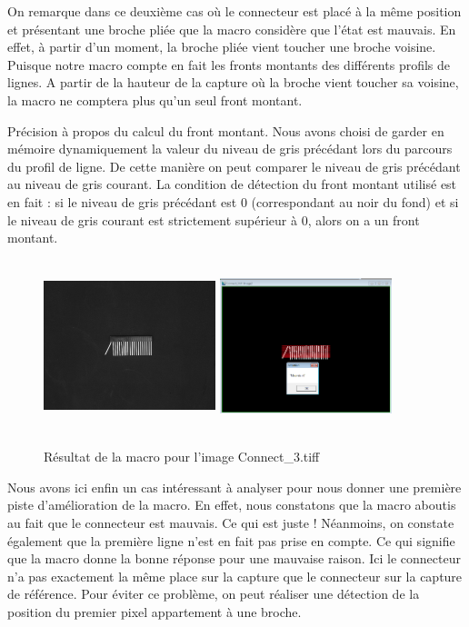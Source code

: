 \documentclass{scrreprt}
\begin{document}
On remarque dans ce deuxième cas où le connecteur est placé à la même position et présentant une broche pliée
que la macro considère que l'état est mauvais. En effet, à partir d'un moment, la broche pliée vient toucher 
une broche voisine. Puisque notre macro compte en fait les fronts montants des différents profils de lignes.
A partir de la hauteur de la capture où la broche vient toucher sa voisine, la macro ne comptera plus qu'un seul
front montant. 

Précision à propos du calcul du front montant. Nous avons choisi de garder en mémoire dynamiquement la valeur du niveau
de gris précédant lors du parcours du profil de ligne. De cette manière on peut comparer le niveau de gris précédant 
au niveau de gris courant. La condition de détection du front montant utilisé est en fait : si le niveau de gris précédant
est 0 (correspondant au noir du fond) et si le niveau de gris courant est strictement supérieur à 0, alors on a un front montant.

\begin{figure}[!h]
\centering
\includegraphics[width=5cm, height=5cm]{images/Connect3o.png}\hfill
\includegraphics[width=5cm, height=5cm]{images/connecteur3.png}
\caption{Résultat de la macro pour l'image Connect_3.tiff}
\end{figure}

Nous avons ici enfin un cas intéressant à analyser pour nous donner une première piste d'amélioration de la macro. 
En effet, nous constatons que la macro aboutis au fait que le connecteur est mauvais. Ce qui est juste ! 
Néanmoins, on constate également que la première ligne n'est en fait pas prise en compte. Ce qui signifie
que la macro donne la bonne réponse pour une mauvaise raison. Ici le connecteur n'a pas exactement la même place 
sur la capture que le connecteur sur la capture de référence. Pour éviter ce problème, on peut réaliser une détection
de la position du premier pixel appartement à une broche. 
\end{document}
